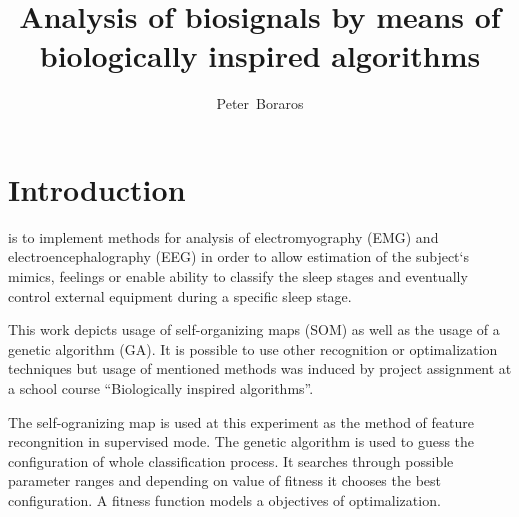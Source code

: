 \documentclass[a4paper]{IEEEtran}
\begin{document}
\title{Analysis of biosignals by means of\\ biologically inspired algorithms}

\author{Peter~Boraros%
}



\maketitle
\IEEEdisplaynotcompsoctitleabstractindextext
\IEEEpeerreviewmaketitle


\section{Introduction}
 is to implement methods for analysis of
electromyography (EMG) and electroencephalography (EEG)
in order to allow estimation of the subject`s mimics, 
feelings or enable ability to classify the sleep stages and eventually control 
external equipment during a specific sleep stage.

This work depicts usage of self-organizing maps (SOM) as well as the usage of a genetic
algorithm (GA). It is possible to use other recognition or optimalization
techniques but usage of mentioned 
methods was induced by project assignment at a school course ``Biologically inspired 
algorithms''.

The self-ogranizing map is used  at this experiment as the method of feature recongnition in 
supervised mode. The genetic algorithm is used to guess the configuration of 
whole classification process. It searches through possible parameter ranges and 
depending on value of fitness it chooses the best configuration. A fitness function
models a objectives of optimalization.
\end{document}

